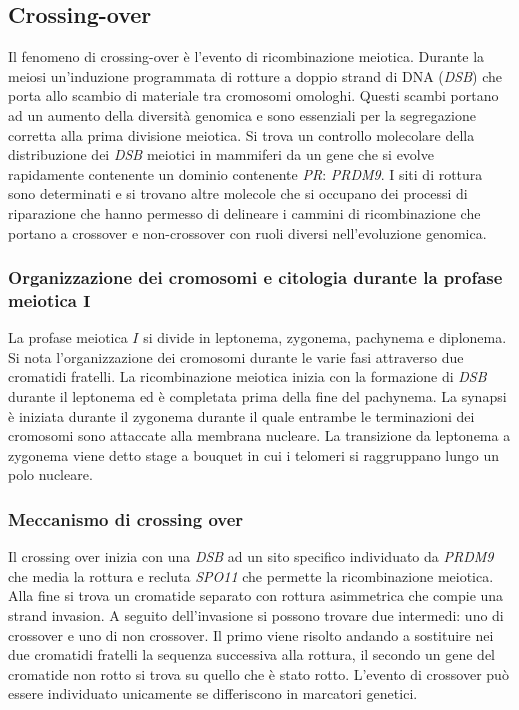 \subsection{Crossing-over}
Il fenomeno di crossing-over \`e l'evento di ricombinazione meiotica. Durante la meiosi un'induzione programmata di rotture a doppio strand di DNA (\emph{DSB}) che porta allo scambio
di materiale tra cromosomi omologhi. Questi scambi portano ad un aumento della diversit\`a genomica e sono essenziali per la segregazione corretta alla prima divisione meiotica. Si trova
un controllo molecolare della distribuzione dei \emph{DSB} meiotici in mammiferi da un gene che si evolve rapidamente contenente un dominio contenente \emph{PR}: \emph{PRDM9}. I siti 
di rottura sono determinati e si trovano altre molecole che si occupano dei processi di riparazione che hanno permesso di delineare i cammini di ricombinazione che portano a crossover
e non-crossover con ruoli diversi nell'evoluzione genomica. 
\subsubsection{Organizzazione dei cromosomi e citologia durante la profase meiotica $\mathbf{I}$}
La profase meiotica $I$ si divide in leptonema, zygonema, pachynema e diplonema. Si nota l'organizzazione dei cromosomi durante le varie fasi attraverso due cromatidi fratelli. La 
ricombinazione meiotica inizia con la formazione di \emph{DSB} durante il leptonema ed \`e completata prima della fine del pachynema. La synapsi \`e iniziata durante il zygonema durante
il quale entrambe le terminazioni dei cromosomi sono attaccate alla membrana nucleare. La transizione da leptonema a zygonema viene detto stage a bouquet in cui i telomeri si 
raggruppano lungo un polo nucleare. 
\subsubsection{Meccanismo di crossing over}
Il crossing over inizia con una \emph{DSB} ad un sito specifico individuato da \emph{PRDM9} che media la rottura e recluta \emph{SPO11} che permette la ricombinazione meiotica. Alla fine
si trova un cromatide separato con rottura asimmetrica che compie una strand invasion. A seguito dell'invasione si possono trovare due intermedi: uno di crossover e uno di non crossover.
Il primo viene risolto andando a sostituire nei due cromatidi fratelli la sequenza successiva alla rottura, il secondo un gene del cromatide non rotto si trova su quello che \`e stato 
rotto. L'evento di crossover pu\`o essere individuato unicamente se differiscono in marcatori genetici. 
